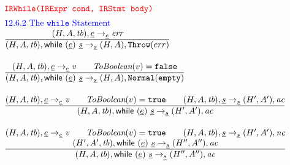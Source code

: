 \[
\begin{array}{l@{~~}l@{~~}ll}
\mtt{\normalsize\inred IRWhile(IRExpr cond, IRStmt body)}\\[.5em]
\mbox{\inblue 12.6.2 The {\tt while} Statement}\\
\frac{\begin{matrix}
\evale, \irexpr \rightarrow_{\ir\expr} \emph{err} 
\end{matrix}}
{\begin{matrix}
\state, \irwhile \rightarrow_{\ir{\stmt}} \res,{\tt Throw}(err)
\end{matrix}}
\\[2em]

\frac{\begin{matrix}
\evale, \irexpr \rightarrow_{\ir\expr} \emph{v} 
\rulesep
\hf{ToBoolean}(v) = \false
\end{matrix}}
{\begin{matrix}
\state, \irwhile \rightarrow_{\ir{\stmt}} \res, \void
\end{matrix}}
\\[2em]

\frac{\begin{matrix}
\evale, \irexpr \rightarrow_{\ir\expr} \emph{v} 
\rulesep
\hf{ToBoolean}(v) = \true
\rulesep
\statel, \ir\stmt \rightarrow_{\ir\stmt} \resp, \ac
\end{matrix}}
{\begin{matrix}
\state, \irwhile \rightarrow_{\ir{\stmt}} \resp, \ac
\end{matrix}}
\\[2em]


\frac{\begin{matrix}
\evale, \irexpr \rightarrow_{\ir\expr} \emph{v} 
\rulesep
\hf{ToBoolean}(v) = \true
\rulesep
\statel, \ir\stmt \rightarrow_{\ir\stmt} \resp, \nc
\\
\statep, \irwhile \rightarrow_{\ir{\stmt}} \respp, \ac
\end{matrix}}
{\begin{matrix}
\state, \irwhile \rightarrow_{\ir{\stmt}} \respp, \ac
\end{matrix}}
\\[2em]


\end{array}\]
